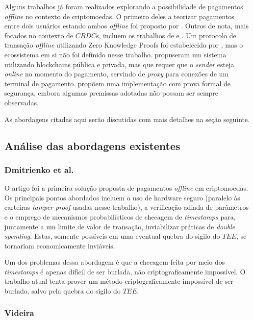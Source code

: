 \documentclass[
  12pt,
  a4paper,
  oneside,
  article,
]{abntex2}
\begin{document}
Alguns trabalhos já foram realizados explorando a possibilidade de pagamentos \textit{offline} no contexto de criptomoedas. O primeiro deles a teorizar pagamentos entre dois usuários estando ambos \textit{offline} foi proposto por \textcite{dmitrienko2017}. Outros de nota, mais focados no contexto de $CBDC$s, incluem os trabalhos de \textcite{videira2023} e \textcite{christodorescu2020}. Um protocolo de transação \textit{offline} utilizando Zero Knowledge Proofs foi estabelecido por \textcite{huayou2026}, mas o ecossistema em si não foi definido nesse trabalho. \textcite{ianov2021} propuseram um sistema utilizando blockchains pública e privada, mas que requer que o \textit{sender} esteja \textit{online} no momento do pagamento, servindo de \textit{proxy} para conexões de um terminal de pagamento. \textcite{jie2024} propõem uma implementação com prova formal de segurança, embora algumas premissas adotadas não possam ser sempre observadas.

As abordagens citadas aqui serão discutidas com mais detalhes na seção seguinte.

\subsection{Análise das abordagens existentes}

\subsubsection{Dmitrienko et al.}

O artigo foi a primeira solução proposta de pagamentos \textit{offline} em criptomoedas. Os principais pontos abordados incluem o uso de hardware seguro (paralelo às carteiras \textit{tamper-proof} usadas nesse trabalho), a verificação adiada de parâmetros e o emprego de mecanismos probabilísticos de checagem de \textit{timestamps} para, juntamente a um limite de valor de transação, inviabilizar práticas de \textit{double spending}. Estas, somente possíveis em uma eventual quebra do sigilo do $TEE$, se tornariam economicamente inviáveis.

Um dos problemas dessa abordagem é que a checagem feita por meio dos \textit{timestamps} é apenas difícil de ser burlada, não criptograficamente impossível. O trabalho atual tenta prover um método criptograficamente impossível de ser burlado, salvo pela quebra do sigilo do $TEE$.

\subsubsection{Videira}
\end{document}
